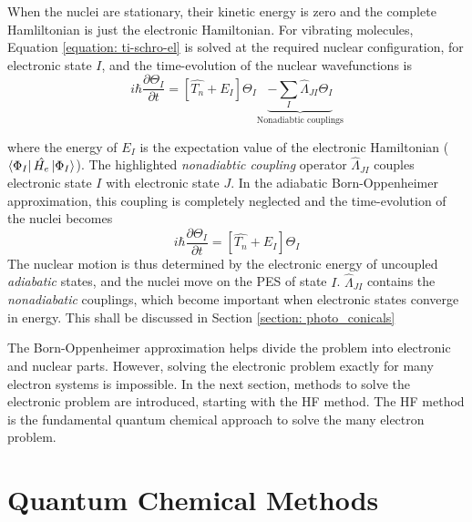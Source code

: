 When the nuclei are stationary, their kinetic energy is zero and the complete Hamliltonian is just the electronic Hamiltonian. For vibrating molecules, Equation \ref{equation: ti-schro-el} is solved at the required nuclear configuration, for electronic state $I$, and the time-evolution of the nuclear wavefunctions is
\begin{equation}\label{equation: nucwavefunctions}
    i\hbar{}\frac{\partial{}\Theta_{I}}{\partial{}t}=[\hat{T_{n}}+E_{I}]\Theta_{I}\underbrace{-\sum_{I}\hat{\Lambda}_{JI}\Theta_{I}}_\text{Nonadiabtic couplings}
\end{equation} 

where the energy of $E_{I}$ is the expectation value of the electronic Hamiltonian ($\bra{\Phi_{I}}\hat{H_e}\ket{\Phi_{I}}$). The highlighted \textit{nonadiabtic coupling} operator $\hat{\Lambda}_{JI}$ couples electronic state $I$ with electronic state $J$. In the adiabatic Born-Oppenheimer approximation, this coupling is completely neglected and the time-evolution of the nuclei becomes
\begin{equation}\label{equation: BO}
    i\hbar{}\frac{\partial{}\Theta_{I}}{\partial{}t}=[\hat{T_{n}}+E_{I}]\Theta_{I}
\end{equation} 
The nuclear motion is thus determined by the electronic energy of uncoupled \textit{adiabatic} states, and the nuclei move on the \ac{PES} of state $I$. $\hat{\Lambda}_{JI}$ contains the \textit{nonadiabatic} couplings, which become important when electronic states converge in energy. This shall be discussed in Section \ref{section: photo_conicals}

The Born-Oppenheimer approximation helps divide the problem into electronic and nuclear parts. However, solving the electronic problem exactly for many electron systems is impossible. In the next section, methods to solve the electronic problem are introduced, starting with the \acf{HF} method. The \ac{HF} method is the fundamental quantum chemical approach to solve the many electron problem.
\section{Quantum Chemical Methods}\label{section: methods}
